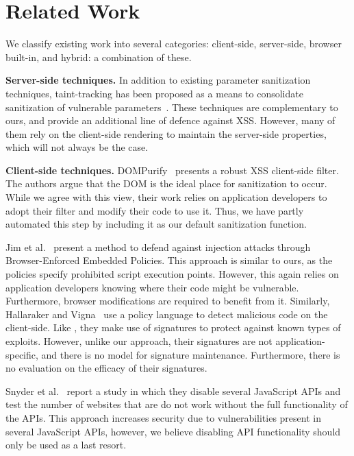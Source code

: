 \section{Related Work}
We classify existing work into several categories: client-side, server-side, browser built-in, and hybrid: a combination of these.

\noindent \textbf{Server-side techniques.}
In addition to existing parameter sanitization techniques,
taint-tracking has been proposed as a means to consolidate
sanitization of vulnerable parameters~\cite{Xu:2006:TPE:1267336.1267345,DBLP:conf/sec/Nguyen-TuongGGSE05,Pietraszek:2005:DAI:2146257.2146267,Bisht:2008:XPD:1428322.1428325}. These
techniques are complementary to ours, and provide an additional line
of defence against \ac{XSS}. However, many of them rely on the
client-side rendering to maintain the server-side properties, which
will not always be the case.

\noindent \textbf{Client-side techniques.}
DOMPurify~\cite{10.1007/978-3-319-66399-9_7} presents a robust
\ac{XSS} client-side filter. The authors
argue that the DOM is the ideal place for sanitization to occur. While
we agree with this view, their work relies on application developers
to adopt their filter and modify their code to use it. Thus, we have partly automated this step by including it as our default sanitization function.

Jim et al.~\cite{Jim:2007:DSI:1242572.1242654} present a method to
defend against injection attacks through Browser-Enforced Embedded
Policies. This approach is similar to ours, as the policies specify
prohibited script execution points. However, this again relies on application developers knowing where their code might be vulnerable. Furthermore, browser modifications are required to benefit from it. Similarly, Hallaraker and Vigna~\cite{Hallaraker:2005:DMJ:1078029.1078861} use a
policy language to detect malicious code on the client-side. Like \sys, they make use of signatures to protect against known types of
exploits. However, unlike our approach, their signatures are not
application-specific, and there is no model for signature
maintenance. Furthermore, there is no evaluation on the efficacy of
their signatures.

Snyder et al.~\cite{Snyder:2017:MWD:3133956.3133966} report a study in which
they disable several JavaScript APIs and test the number of websites
that are do not work without the full functionality of the APIs. This approach increases security due to vulnerabilities present in several
JavaScript APIs, however, we believe disabling API functionality
should only be used as a last resort.

